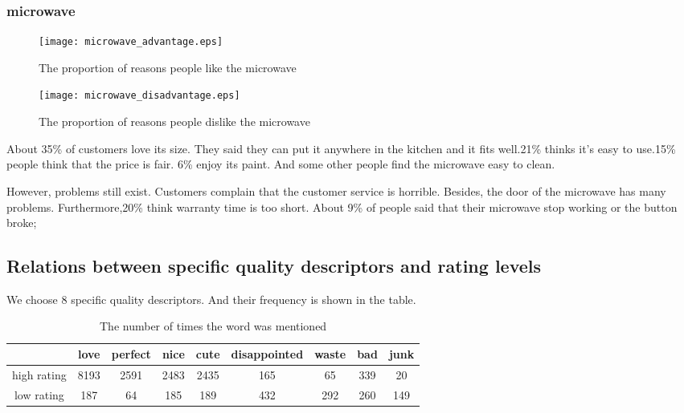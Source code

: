 \documentclass{mcmthesis}
\begin{document}
	\subsubsection{microwave}
	\begin{figure}[H]
		\begin{minipage}[t]{0.5\textwidth}
			\centering
			\texttt{[image: microwave\_advantage.eps]}
			\caption{The proportion of reasons people like the microwave\label{fig:1}}
		\end{minipage}
		\qquad
		\begin{minipage}[t]{0.5\textwidth}
			\centering
			\texttt{[image: microwave\_disadvantage.eps]}
			\caption{The proportion of reasons people dislike the microwave\label{fig:2}}
		\end{minipage}
	\end{figure}
	\begin{flushleft}
		About 35\% of customers love its size. They said they can put it anywhere in the kitchen and it fits well.21\% thinks it's easy to use.15\% people think that the price is fair.
		6\% enjoy its paint. And some other people find the microwave easy to clean.
	\end{flushleft}
	\begin{flushleft}
		However, problems still exist. Customers complain that the customer service is horrible. Besides, the door of the microwave has many problems. Furthermore,20\% think warranty time is too short. About 9\% of people said that their microwave stop working or the button broke;
	\end{flushleft}
	
	
	\subsection{Relations between specific quality descriptors and rating levels}
	We choose 8 specific quality descriptors. And their frequency is shown in the table.
	\begin{table}[H]
		\centering
		\caption{The number of times the word was mentioned}
		\begin{tabular}{|c|c|c|c|c|c|c|c|c|}
			\hline 
			& love & perfect & nice & cute & disappointed & waste & bad & junk \\ 
			\hline 
			high rating & 8193 & 2591 & 2483 & 2435 & 165 & 65 & 339 & 20 \\ 
			\hline 
			low rating & 187 & 64 & 185 & 189 & 432 & 292 & 260 & 149 \\ 
			\hline 
		\end{tabular}
	\end{table}
	
\end{document}
